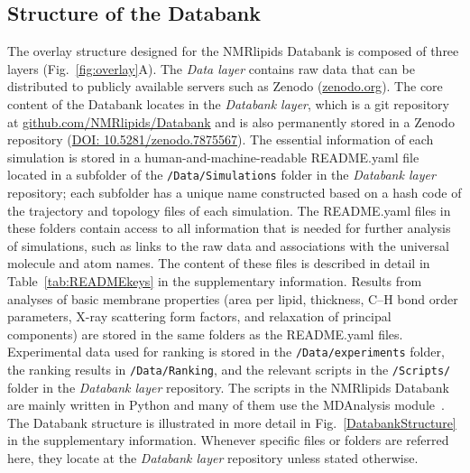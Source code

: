 \documentclass[fleqn,10pt]{wlscirep}
\begin{document}
\subsection{Structure of the Databank}
The overlay structure designed for the NMRlipids Databank is composed of three layers (Fig.~\ref{fig:overlay}A). The {\it Data layer} contains raw data that can be distributed to publicly available servers such as Zenodo (\href{https://www.zenodo.org/}{zenodo.org}). The core content of the Databank locates in the {\it Databank layer}, which is a git repository at \href{https://github.com/NMRlipids/Databank/}{github.com/NMRlipids/Databank} and is also permanently stored in a Zenodo repository (\href{https://doi.org/10.5281/zenodo.7875567}{DOI: 10.5281/zenodo.7875567}). The essential information of each simulation is stored in a human-and-machine-readable README.yaml file located in a subfolder of the \texttt{/Data/Simulations} folder in the {\it Databank layer} repository; each subfolder has a unique name constructed based on a hash code of the trajectory and topology files of each simulation. The README.yaml files in these folders contain access to all information that is needed for further analysis of simulations, such as links to the raw data and associations with the universal molecule and atom names. The content of these files is described in detail in Table~\ref{tab:READMEkeys} in the supplementary information. Results from analyses of basic membrane properties (area per lipid, thickness, C--H bond order parameters, X-ray scattering form factors, and relaxation of principal components) are stored in the same folders as the README.yaml files. Experimental data used for ranking is stored in the \texttt{/Data/experiments} folder, the ranking results in \texttt{/Data/Ranking}, and the relevant scripts in the \texttt{/Scripts/} folder in the {\it Databank layer} repository. The scripts in the NMRlipids Databank are mainly written in Python and many of them use the MDAnalysis module~\cite{gowers2019mdanalysis,michaud2011mdanalysis}. The Databank structure is illustrated in more detail in Fig.~\ref{DatabankStructure} in the supplementary information. Whenever specific files or folders are referred here, they locate at the {\it Databank layer} repository unless stated otherwise. 
\end{document}
